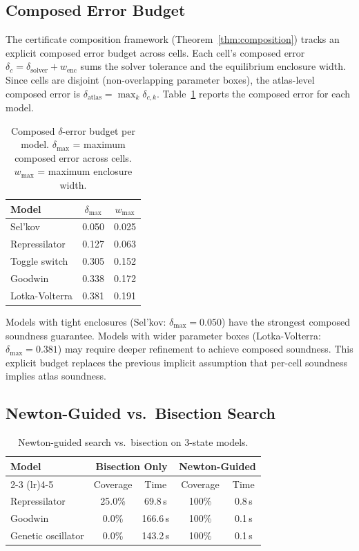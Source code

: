 \documentclass[11pt]{article}
\begin{document}
\subsection{Composed Error Budget}

The certificate composition framework (Theorem~\ref{thm:composition}) tracks an explicit composed error budget across cells.
Each cell's composed error $\delta_c = \delta_{\mathrm{solver}} + w_{\mathrm{enc}}$ sums the solver tolerance and the equilibrium enclosure width.
Since cells are disjoint (non-overlapping parameter boxes), the atlas-level composed error is $\delta_{\mathrm{atlas}} = \max_k \delta_{c,k}$.
Table~\ref{tab:composed} reports the composed error for each model.

\begin{table}[t]
\centering
\caption{Composed $\delta$-error budget per model. $\delta_{\max}$ = maximum composed error across cells. $w_{\max}$ = maximum enclosure width.}
\label{tab:composed}
\small
\begin{tabular}{@{}lcc@{}}
\toprule
Model & $\delta_{\max}$ & $w_{\max}$ \\
\midrule
Sel'kov            & 0.050 & 0.025 \\
Repressilator      & 0.127 & 0.063 \\
Toggle switch      & 0.305 & 0.152 \\
Goodwin            & 0.338 & 0.172 \\
Lotka-Volterra     & 0.381 & 0.191 \\
\bottomrule
\end{tabular}
\end{table}

Models with tight enclosures (Sel'kov: $\delta_{\max} = 0.050$) have the strongest composed soundness guarantee.
Models with wider parameter boxes (Lotka-Volterra: $\delta_{\max} = 0.381$) may require deeper refinement to achieve composed soundness.
This explicit budget replaces the previous implicit assumption that per-cell soundness implies atlas soundness.

\subsection{Newton-Guided vs.\ Bisection Search}

\begin{table}[t]
\centering
\caption{Newton-guided search vs.\ bisection on 3-state models.}
\label{tab:newton}
\small
\begin{tabular}{@{}lcccc@{}}
\toprule
Model & \multicolumn{2}{c}{Bisection Only} & \multicolumn{2}{c}{Newton-Guided} \\
\cmidrule(lr){2-3} \cmidrule(lr){4-5}
 & Coverage & Time & Coverage & Time \\
\midrule
Repressilator      & 25.0\% & 69.8\,s  & 100\% & 0.8\,s \\
Goodwin            & 0.0\%  & 166.6\,s & 100\% & 0.1\,s \\
Genetic oscillator & 0.0\%  & 143.2\,s & 100\% & 0.1\,s \\
\bottomrule
\end{tabular}
\end{table}
\end{document}
